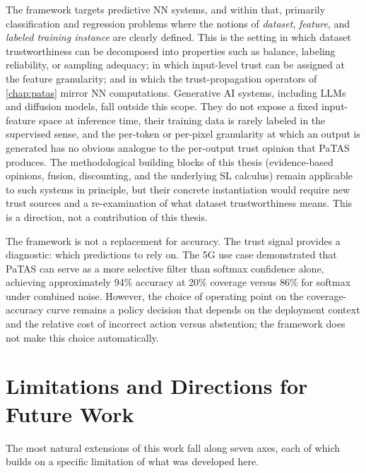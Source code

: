 The framework targets predictive \ac{NN} systems, and within that, primarily classification and regression problems where the notions of \emph{dataset}, \emph{feature}, and \emph{labeled training instance} are clearly defined. This is the setting in which dataset trustworthiness can be decomposed into properties such as balance, labeling reliability, or sampling adequacy; in which input-level trust can be assigned at the feature granularity; and in which the trust-propagation operators of \cref{chap:patas} mirror \ac{NN} computations. Generative \ac{AI} systems, including \acp{LLM} and diffusion models, fall outside this scope. They do not expose a fixed input-feature space at inference time, their training data is rarely labeled in the supervised sense, and the per-token or per-pixel granularity at which an output is generated has no obvious analogue to the per-output trust opinion that PaTAS produces. The methodological building blocks of this thesis (evidence-based opinions, fusion, discounting, and the underlying \ac{SL} calculus) remain applicable to such systems in principle, but their concrete instantiation would require new trust sources and a re-examination of what dataset trustworthiness means. This is a direction, not a contribution of this thesis.

The framework is not a replacement for accuracy. The trust signal provides a diagnostic: which predictions to rely on. The 5G use case demonstrated that PaTAS can serve as a more selective filter than softmax confidence alone, achieving approximately 94\% accuracy at 20\% coverage versus 86\% for softmax under combined noise. However, the choice of operating point on the coverage-accuracy curve remains a policy decision that depends on the deployment context and the relative cost of incorrect action versus abstention; the framework does not make this choice automatically.

\section{Limitations and Directions for Future Work}
\label{sec:conclusion-future}

The most natural extensions of this work fall along seven axes, each of which builds on a specific limitation of what was developed here.

